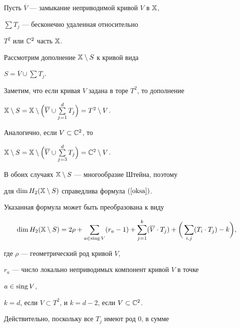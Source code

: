 Пусть $\overline{V}$ --- замыкание неприводимой кривой $V$ в $\Bbb X$,


$\sum T_j$ --- бесконечно удаленная относительно


$T^2$ или $\Bbb C^2$  часть $\Bbb X$.


Рассмотрим дополнение $\Bbb X\setminus S$ к кривой вида


$S=\overline{V}\cup \sum T_j$.


Заметим, что если кривая $V$ задана в торе $T^2$, то дополнение


$\Bbb X\setminus S=


\Bbb X\setminus \Big(\overline{V}\cup\sum\limits_{j=1}^d T_j\Big)=


T^2\setminus V$.


Аналогично, если $V\subset \Bbb C^2$, то


$\Bbb X\setminus S =


\Bbb X \setminus\Big(\overline{V} \cup \sum\limits_{j=3}^{d} T_j\Big)


= \Bbb C^2 \setminus V$.





В обоих случаях $\Bbb X\setminus S$ --- многообразие Штейна, поэтому


для $\dim H_2(\Bbb X\setminus S)$ справедлива формула $(\ref{oksa})$.


Указанная формула может быть преобразована к виду


\begin{equation}


\label{oksa1}


\dim H_2(\Bbb X\setminus S) =


2\rho +\sum\limits_{a\in\sing V} (r_a-1) +


\sum\limits_{j=1}^k (\overline{V}\cdot T_j)


+ \bigg( \sum\limits_{i,j}(T_i\cdot T_j) - k \bigg),


\end{equation}


где $\rho$ --- геометрический род кривой $V$,


$r_a$ --- число локально неприводимых компонент кривой $V$ в точке


$a\in\operatorname{sing} V$,


$k=d$, если $V\subset T^2$, и $k=d-2$, если $V\subset \Bbb C^2$.





Действительно, поскольку все $T_j$ имеют род 0, в сумме


